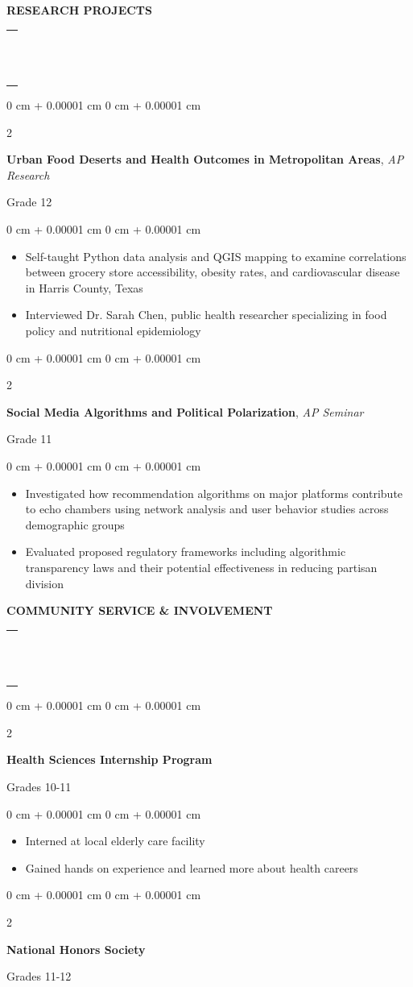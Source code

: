 \documentclass[10pt, letterpaper]{article}
\makeatletter
\newcommand{\sectiondoubleline}[1]{%
  \vspace{0.3cm}
  {\needspace{0.5\baselineskip}\noindent\large\bfseries\color{textColor}#1}\par
  \vspace{-0.55em}
  \noindent\begin{tabular}{@{}p{\textwidth}@{}}
  \textcolor{primaryColor}{\rule{\textwidth}{1.65pt}} \\[-1.7ex]
  \textcolor{secondaryColor}{\rule{\textwidth}{1.65pt}}
  \end{tabular}\par
  \vspace{0.1cm}
}
\newenvironment{highlights}{
    \begin{itemize}[
        topsep=0.10 cm,
        parsep=0.10 cm,
        partopsep=0pt,
        itemsep=0pt,
        leftmargin=0 cm + 10pt
    ]
}{
    \end{itemize}
}
\newenvironment{onecolentry}{
    \begin{adjustwidth}{
        0 cm + 0.00001 cm
    }{
        0 cm + 0.00001 cm
    }
}{
    \end{adjustwidth}
}
\newenvironment{twocolentry}[2][]{
    \onecolentry
    \def\secondColumn{#2}
    \setcolumnwidth{\fill, 4.5 cm}
    \begin{paracol}{2}
}{
    \switchcolumn \raggedleft \secondColumn
    \end{paracol}
    \endonecolentry
}
\makeatother
\begin{document}
\vspace{0.1 cm}
\sectiondoubleline{RESEARCH PROJECTS \faChartBar}
\vspace{0.10 cm}
\begin{twocolentry}{
    Grade 12
}
    \textbf{Urban Food Deserts and Health Outcomes in Metropolitan Areas}, \textit{AP Research}
\end{twocolentry}
\vspace{0.10 cm}
\begin{onecolentry}
    \begin{highlights}
      \item Self-taught Python data analysis and QGIS mapping to examine correlations between grocery store accessibility, obesity rates, and cardiovascular disease in Harris County, Texas
        \item Interviewed Dr. Sarah Chen, public health researcher specializing in food policy and nutritional epidemiology
    \end{highlights}
\end{onecolentry}
\begin{twocolentry}{
    Grade 11
}
\vspace{0.2 cm}
    \textbf{Social Media Algorithms and Political Polarization}, \textit{AP Seminar}
\end{twocolentry}
\vspace{0.10 cm}
\begin{onecolentry}
    \begin{highlights}
        \item Investigated how recommendation algorithms on major platforms contribute to echo chambers using network analysis and user behavior studies across demographic groups
        \item Evaluated proposed regulatory frameworks including algorithmic transparency laws and their potential effectiveness in reducing partisan division
    \end{highlights}
\end{onecolentry}

\vspace{0.15 cm}
\sectiondoubleline{COMMUNITY SERVICE \& INVOLVEMENT \faHandHoldingHeart}

\begin{twocolentry}{
    Grades 10-11
}
    \textbf{Health Sciences Internship Program}
\end{twocolentry}

\vspace{0.10 cm}
\begin{onecolentry}
    \begin{highlights}
        \item Interned at local elderly care facility
        \item Gained hands on experience and learned more about health careers
    \end{highlights}
\end{onecolentry}
\begin{twocolentry}{
    Grades 11-12
}
    \textbf{National Honors Society}
\end{twocolentry}
\end{document}
